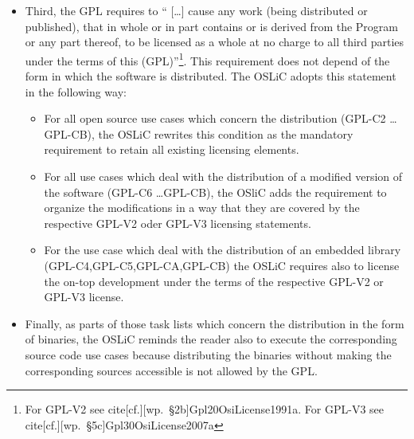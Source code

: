 \begin{itemize}
\begin{itemize}
    \item Third, the GPL requires to \enquote{ [\ldots] cause any work (being
    distributed or published), that in whole or in part contains or is derived
    from the Program or any part thereof, to be licensed as a whole at no charge
    to all third parties under the terms of this (GPL)}\footnote{For GPL-V2 see
    cite[cf.][\nopage wp.\ §2b]{Gpl20OsiLicense1991a}. For GPL-V3 see
    cite[cf.][\nopage wp.\ §5c]{Gpl30OsiLicense2007a}}. This requirement does
    not depend of the form in which the software is distributed. The OSLiC
    adopts this statement in the following way:
    \begin{itemize}
      \item For all open source use cases which concern the distribution (GPL-C2
      \ldots GPL-CB), the OSLiC rewrites this condition as the mandatory
      requirement to retain all existing licensing elements.
      
      \item For all use cases which deal with the distribution of a modified
      version of the software (GPL-C6 \ldots GPL-CB), the OSliC adds the
      requirement to organize the modifications in a way that they are covered
      by the respective GPL-V2 oder GPL-V3 licensing statements.
      
      \item For the use case which deal with the distribution of an embedded
      library (GPL-C4,GPL-C5,GPL-CA,GPL-CB) the OSLiC requires also to license
      the on-top development under the terms of the respective GPL-V2 or GPL-V3
      license.
    \end{itemize}
   
    \item Finally, as parts of those task lists which concern the distribution
    in the form of binaries, the OSLiC reminds the reader also to execute the
    corresponding source code use cases because distributing the binaries
    without making the corresponding sources accessible is not allowed by the
    GPL.
  \end{itemize}
  

\end{itemize}





%
